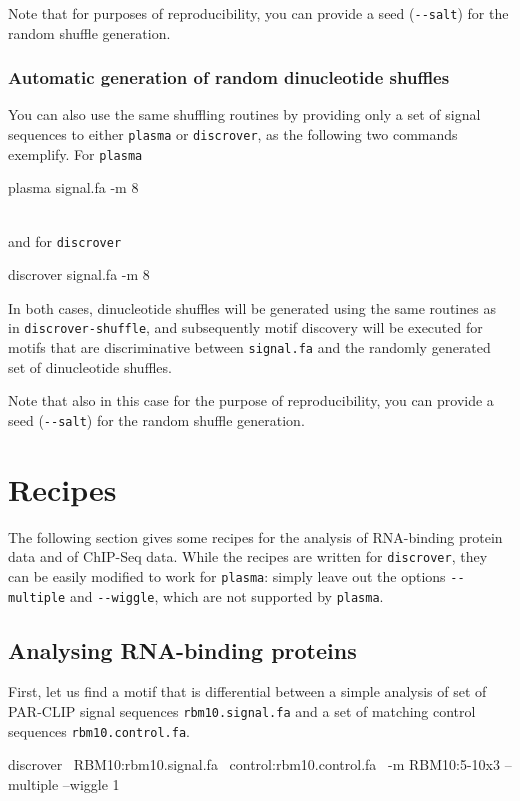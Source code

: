 \documentclass[a4paper]{article}
\newcommand{\plasma}[0]{\texttt{plasma}}
\newcommand{\discrover}[0]{\texttt{discrover}}
\newcommand{\dinuclshuffle}[0]{\texttt{discrover-shuffle}}
\begin{document}
Note that for purposes of reproducibility, you can provide a seed (\verb|--salt|) for the random shuffle generation.

\subsubsection{Automatic generation of random dinucleotide shuffles}
You can also use the same shuffling routines by providing only a set of signal sequences to either \plasma{} or \discrover{}, as the following two commands exemplify.
For \plasma{}\\
\begin{verbbox}
plasma signal.fa -m 8
\end{verbbox}
\fbox{\theverbbox[t]}\\
and for \discrover{}\\
\begin{verbbox}
discrover signal.fa -m 8
\end{verbbox}
\fbox{\theverbbox[t]}

In both cases, dinucleotide shuffles will be generated using the same routines as in \dinuclshuffle{}, and subsequently motif discovery will be executed for motifs that are discriminative between \verb|signal.fa| and the randomly generated set of dinucleotide shuffles.

Note that also in this case for the purpose of reproducibility, you can provide a seed (\verb|--salt|) for the random shuffle generation.


\section{Recipes}
The following section gives some recipes for the analysis of RNA-binding protein data and of ChIP-Seq data.
While the recipes are written for \discrover{}, they can be easily modified to work for \plasma{}:
simply leave out the options \verb|--multiple| and \verb|--wiggle|, which are not supported by \plasma{}.

\subsection{Analysing RNA-binding proteins}
First, let us find a motif that is differential between a simple analysis of set of PAR-CLIP signal sequences \verb|rbm10.signal.fa| and a set of matching control sequences \verb|rbm10.control.fa|.
\\
\begin{verbbox}
discrover \
RBM10:rbm10.signal.fa \
control:rbm10.control.fa \
-m RBM10:5-10x3 --multiple --wiggle 1
\end{verbbox}
\fbox{\theverbbox[t]}
\end{document}

